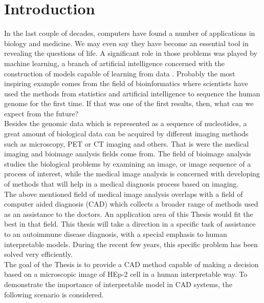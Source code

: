 

\chapter{Introduction} 

\label{Chapter1} 



In the last couple of decades, computers  have found a number of applications in biology and medicine. We may even say they have become an essential tool in revealing the questions of life. A significant role in those problems was played by machine learning, a branch of artificial intelligence concerned with the construction of models capable of learning from data . Probably the most inspiring example comes from the field of bioinformatics where scientists have used the methods from  statistics and artificial intelligence to sequence the human genome for the first time. If that was one of the first results, then, what can we expect from the future? \\

Besides the genomic data which is represented as a sequence of nucleotides, a great amount of  biological data can be acquired by different imaging methods such as microscopy, PET or CT imaging and others. That is were the medical imaging and bioimage analysis fields come from. The field of bioimage analysis studies the biological problems by examining an image, or image sequence of a process of interest, while the medical image analysis is concerned with developing of methods that will help in a medical diagnosis process based on imaging. \\

The above mentioned field of medical image analysis overlaps with a field of computer aided diagnosis (CAD) which collects a broader range of methods used as an assistance to the doctors. An application area of this Thesis would fit the best in that field. This thesis will take a direction in a specific task of assistance to an autoimmune disease diagnosis, with a special emphasis to human interpretable models. During the recent few years, this specific problem has been solved very efficiently. \\

The goal of the Thesis is to provide a  CAD method capable of making a decision based on a microscopic image of HEp-2 cell in a human interpretable way. To demonstrate the importance of interpretable model in CAD systems, the following scenario is considered.

